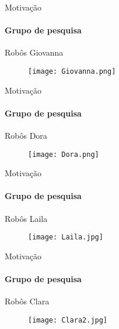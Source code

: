 \documentclass[25pt,landscape]{beamer}
\begin{document}
\begin{frame}{Motiva\c{c}\~ao}
	\framesubtitle{Grupo de pesquisa}
	\begin{block}{Rob\^os}
		Giovanna
    \end{block}
    \begin{figure}[!h]
        \centering
        \texttt{[image: Giovanna.png]}
    \end{figure}
\end{frame}

\begin{frame}{Motiva\c{c}\~ao}
	\framesubtitle{Grupo de pesquisa}
	\begin{block}{Rob\^os}
		Dora
    \end{block}
    \begin{figure}[!h]
        \centering
        \texttt{[image: Dora.png]}
    \end{figure}
\end{frame}

\begin{frame}{Motiva\c{c}\~ao}
	\framesubtitle{Grupo de pesquisa}
	\begin{block}{Rob\^os}
		Laila
    \end{block}
    \begin{figure}[!h]
        \centering
        \texttt{[image: Laila.jpg]}
    \end{figure}
\end{frame}

\begin{frame}{Motiva\c{c}\~ao}
	\framesubtitle{Grupo de pesquisa}
	\begin{block}{Rob\^os}
		Clara
    \end{block}
    \begin{figure}[!h]
        \centering
        \texttt{[image: Clara2.jpg]}
    \end{figure}
\end{frame}
\end{document}
